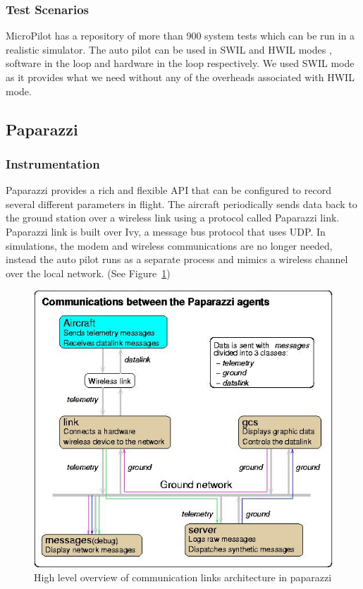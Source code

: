 \subsubsection{Test Scenarios}
MicroPilot has a repository of more than 900 system tests which can be run in a realistic simulator. The auto pilot can be used in SWIL and HWIL modes \cite{melmoth2019true}, software in the loop and hardware in the loop respectively. We used SWIL mode as it provides what we need without any of the overheads associated with HWIL mode. 

\subsection{Paparazzi}\label{sec:paparazzi_data_collection}

\subsubsection{Instrumentation}
Paparazzi provides a rich and flexible API that can be configured to record several different parameters in flight. The aircraft periodically sends data back to the ground station over a wireless link using a protocol called Paparazzi link. Paparazzi link is built over Ivy, a message bus protocol that uses UDP. In simulations, the modem and wireless communications are no longer needed, instead the auto pilot runs as a separate process and mimics a wireless channel over the local network. (See Figure~\ref{fig:paparazzi_comm_agents})

\begin{figure}
    \centering
    \includegraphics[width=\columnwidth]{4_files/Pprz_communication_agents.jpg}
    \caption{High level overview of communication links architecture in paparazzi \cite{hattenberger2014using}}
    \label{fig:paparazzi_comm_agents}
\end{figure}

